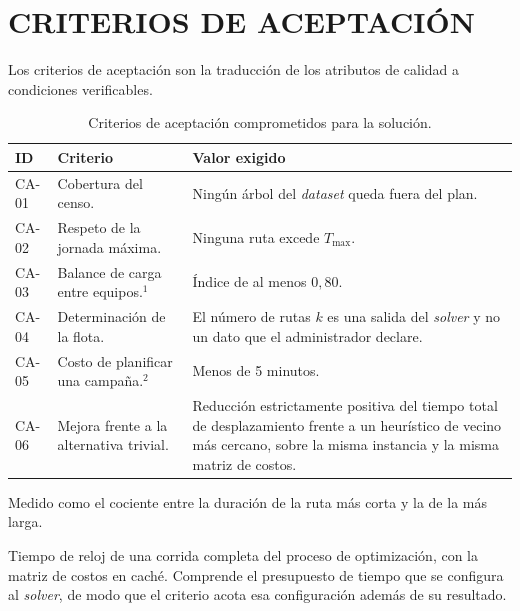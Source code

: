 \section{CRITERIOS DE ACEPTACIÓN}
\label{sec:criterios-aceptacion}

Los criterios de aceptación son la traducción de los atributos de calidad a condiciones
verificables.

\begin{table}[H]
  \centering
  \begin{threeparttable}[b]
  \caption{Criterios de aceptación comprometidos para la solución.}
  \label{tab:criterios}
  \small
  \begin{tabularx}{\textwidth}{@{}l X X@{}}
    \toprule
    ID &
    Criterio &
    Valor exigido \\
    \midrule
    CA-01 &
    Cobertura del censo. &
    Ningún árbol del \textit{dataset} queda fuera del plan. \\
    \addlinespace
    CA-02 &
    Respeto de la jornada máxima. &
    Ninguna ruta excede $T_{\max}$. \\
    \addlinespace
    CA-03 &
    Balance de carga entre equipos.$^{1}$ &
    Índice de al menos $0{,}80$. \\
    \addlinespace
    CA-04 &
    Determinación de la flota. &
    El número de rutas $k$ es una salida del \textit{solver} y no un dato que el administrador
    declare. \\
    \addlinespace
    CA-05 &
    Costo de planificar una campaña.$^{2}$ &
    Menos de 5 minutos. \\
    \addlinespace
    CA-06 &
    Mejora frente a la alternativa trivial. &
    Reducción estrictamente positiva del tiempo total de desplazamiento frente a un heurístico de
    vecino más cercano, sobre la misma instancia y la misma matriz de costos. \\
    \bottomrule
  \end{tabularx}
  \begin{tablenotes}[flushleft]\footnotesize
    \item[1] Medido como el cociente entre la duración de la ruta más corta y la de la más larga.
    \item[2] Tiempo de reloj de una corrida completa del proceso de optimización, con la matriz de
      costos en caché. Comprende el presupuesto de tiempo que se configura al \textit{solver}, de
      modo que el criterio acota esa configuración además de su resultado.
  \end{tablenotes}
  \end{threeparttable}
\end{table}
